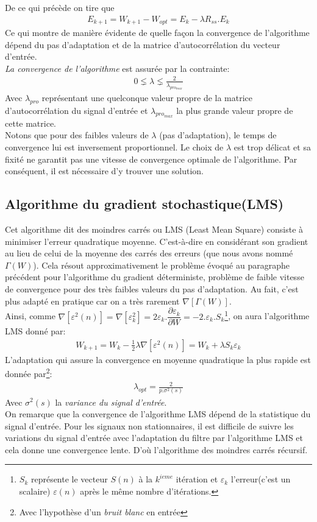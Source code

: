 De ce qui précède on tire que
\begin{eqnarray}
E_{k+1} = W_{k+1} - W_{opt} = E_{k} - \lambda R_{ss}.E_{k}
\end{eqnarray}
Ce qui montre de manière évidente de quelle façon la convergence de l'algorithme dépend du pas d'adaptation et de la matrice d'autocorrélation du vecteur d'entrée.\\
\emph{La convergence de l'algorithme} est assurée par la contrainte\cite{Esiee}:
\begin{eqnarray}
0 \lneq \lambda \lneq \frac{2}{\lambda_{pro_{max}}}
\end{eqnarray}
Avec $ \lambda_{pro} $ représentant une quelconque valeur propre de la matrice d'autocorrélation du signal d'entrée et $ \lambda_{pro_{max}} $ la plus grande valeur propre de cette matrice.\\
Notons que pour des faibles valeurs de $ \lambda $ (pas d'adaptation), le temps de convergence lui est inversement proportionnel. Le choix de $ \lambda $ est trop délicat et sa fixité ne garantit pas une vitesse de convergence optimale de l'algorithme. Par conséquent, il est nécessaire d'y trouver une solution.
\subsection{Algorithme du gradient stochastique(LMS) \cite{ThAlaedine}}
Cet algorithme dit des moindres carrés ou LMS (Least Mean Square) consiste à minimiser l'erreur quadratique moyenne. C'est-à-dire en considérant son gradient au lieu de celui de la moyenne des carrés des erreurs (que nous avons nommé $ \Gamma(W) $). Cela résout approximativement le problème évoqué au paragraphe précédent pour l'algorithme du gradient déterministe, problème de faible vitesse de convergence pour des très faibles valeurs du pas d'adaptation. Au fait, c'est plus adapté en pratique car on a très rarement $ \nabla [\Gamma(W)] $.\\ Ainsi, comme $ \nabla [\varepsilon^{2}(n)] = \nabla[\varepsilon_{k}^{2}] = 2\varepsilon_{k}.\dfrac{\partial \varepsilon_{k}}{\partial W} = -2.\varepsilon_{k}.S_{k} $\footnote{$ S_{k} $ représente le vecteur $ S(n) $ à la $ k^{ieme} $ itération et $ \varepsilon_{k} $ l'erreur(c'est un scalaire) $ \varepsilon(n) $ après le même nombre d'itérations.}, on aura l'algorithme LMS donné par:
\begin{eqnarray}\label{AlgoLMS}
W_{k+1} = W_{k} - \frac{1}{2}\lambda\nabla [\varepsilon^{2}(n)] = W_{k} + \lambda S_{k}\varepsilon_{k}
\end{eqnarray}
L'adaptation qui assure la convergence en moyenne quadratique la plus rapide est donnée par\footnote{Avec l'hypothèse d'un \emph{bruit blanc} en entrée}:
\begin{eqnarray}
\lambda_{opt} = \frac{2}{p.\sigma^{2}(s)}
\end{eqnarray}
Avec $ \sigma^{2}(s) $ la \emph{variance du signal d'entrée}.\\
On remarque que la convergence de l'algorithme LMS dépend de la statistique du signal d'entrée. Pour les signaux non stationnaires, il est difficile de suivre les variations du signal d'entrée avec l'adaptation du filtre par l'algorithme LMS et cela donne une convergence lente. D'où l'algorithme des moindres carrés récursif.
